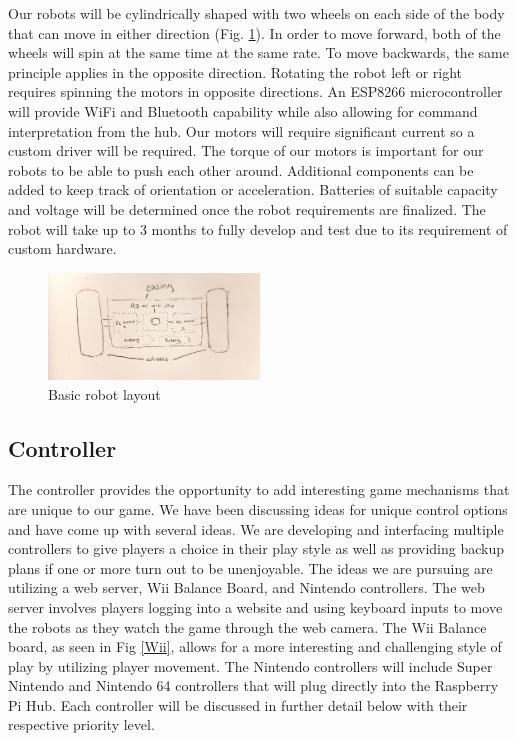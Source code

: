 \documentclass[11pt]{ieeeconf}
\begin{document}
Our robots will be cylindrically shaped with two wheels on each side of the body that can move in either direction (Fig. \ref{RobotFig}). In order to move forward, both of the wheels will spin at the same time at the same rate. To move backwards, the same principle applies in the opposite direction. Rotating the robot left or right requires spinning the motors in opposite directions. An ESP8266 microcontroller will provide WiFi and Bluetooth capability while also allowing for command interpretation from the hub. Our motors will require significant current so a custom driver will be required. The torque of our motors is important for our robots to be able to push each other around. Additional components can be added to keep track of orientation or acceleration. Batteries of suitable capacity and voltage will be determined once the robot requirements are finalized. The robot will take up to 3 months to fully develop and test due to its requirement of custom hardware. 

 \begin{figure}[H]
  \centering
      \includegraphics[width=0.5\textwidth]{images/RobotSketch.pdf}
        \caption{Basic robot layout}
        \label{RobotFig}
\end{figure}

\subsection{Controller}

The controller provides the opportunity to add interesting game mechanisms that are unique to our game. We have been discussing ideas for unique control options and have come up with several ideas. We are developing and interfacing multiple controllers to give players a choice in their play style as well as providing backup plans if one or more turn out to be unenjoyable. The ideas we are pursuing are utilizing a web server, Wii Balance Board, and Nintendo controllers. The web server involves players logging into a website and using keyboard inputs to move the robots as they watch the game through the web camera. The Wii Balance board, as seen in Fig \ref{Wii}, allows for a more interesting and challenging style of play by utilizing player movement. The Nintendo controllers will include Super Nintendo and Nintendo 64 controllers that will plug directly into the Raspberry Pi Hub. Each controller will be discussed in further detail below with their respective priority level.
\end{document}
